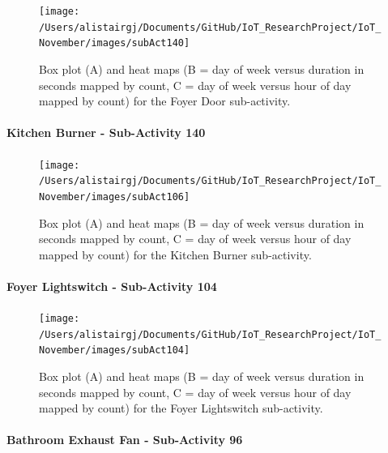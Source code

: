 \documentclass[11pt,]{article}
\let\oldparagraph\paragraph
\renewcommand{\paragraph}[1]{\oldparagraph{#1}\mbox{}}
\begin{document}
\begin{figure}[H]

{\centering \texttt{[image: /Users/alistairgj/Documents/GitHub/IoT\_ResearchProject/IoT\_November/images/subAct140]} 

}

\caption{Box plot (A) and heat maps (B = day of week versus duration in seconds mapped by count, C = day of week versus hour of day mapped by count) for the Foyer Door sub-activity.}\label{fig:subAct140}
\end{figure}

\hypertarget{kitchen-burner---sub-activity-140}{%
\paragraph{Kitchen Burner - Sub-Activity
140}\label{kitchen-burner---sub-activity-140}}

\begin{figure}[H]

{\centering \texttt{[image: /Users/alistairgj/Documents/GitHub/IoT\_ResearchProject/IoT\_November/images/subAct106]} 

}

\caption{Box plot (A) and heat maps (B = day of week versus duration in seconds mapped by count, C = day of week versus hour of day mapped by count) for the Kitchen Burner sub-activity.}\label{fig:subAct106}
\end{figure}

\hypertarget{foyer-lightswitch---sub-activity-104}{%
\paragraph{Foyer Lightswitch - Sub-Activity
104}\label{foyer-lightswitch---sub-activity-104}}

\begin{figure}[H]

{\centering \texttt{[image: /Users/alistairgj/Documents/GitHub/IoT\_ResearchProject/IoT\_November/images/subAct104]} 

}

\caption{Box plot (A) and heat maps (B = day of week versus duration in seconds mapped by count, C = day of week versus hour of day mapped by count) for the Foyer Lightswitch sub-activity.}\label{fig:subAct104}
\end{figure}

\hypertarget{bathroom-exhaust-fan---sub-activity-96}{%
\paragraph{Bathroom Exhaust Fan - Sub-Activity
96}\label{bathroom-exhaust-fan---sub-activity-96}}
\end{document}
